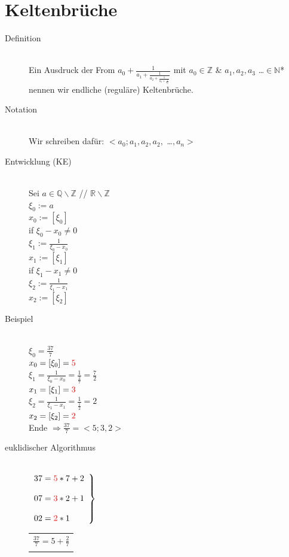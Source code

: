 \documentclass[10pt]{article}
\newcommand{\RN}{\mathbb{R}} %
\newcommand{\NN}{\mathbb{N}} %
\newcommand{\QN}{\mathbb{Q}} %
\newcommand{\ZN}{\mathbb{Z}} %
\newcommand{\Brackar}[2]{\left.\begin{array}{#1} #2 \end{array}\right\rbrace} %
\begin{document}
\section{Keltenbrüche}
\begin{description}
	\item[Definition] \hfill \\
		Ein Ausdruck der From $a_0 + \frac{1}{a_1+\frac{1}{a_2+ \frac{1}{a_3+\frac{1}{a_n}}}}$ mit $a_0 \in \ZN$ \& $a_1,a_2,a_3$ \dots $\in \NN$* nennen wir endliche (reguläre) Keltenbrüche.
	\item[Notation] \hfill \\
		Wir schreiben dafür: $<a_0;a_1,a_2,a_2,$ \dots $,a_n>$
	\item[Entwicklung (KE)] \hfill \\
		Sei $a \in \QN \backslash \ZN$ // $\RN \backslash \ZN$ \\
		$\xi_0:=a$ \\
		$x_0:=[\xi_0]$ \\
		{\color{red}if} $\xi_0-x_0 \neq 0$ \\
		$\xi_1:=\frac{1}{\xi_0-x_0}$ \\
		$x_1:=[\xi_1]$ \\
		{\color{red}if} $\xi_1-x_1 \neq 0$ \\
		$\xi_2:=\frac{1}{\xi_1-x_1}$ \\
		$x_2:=[\xi_2]$
	\item[Beispiel] \hfill \\
		$\xi_0=\frac{37}{7}$ \\
		$x_0=[\xi_0]={\color{red}5}$ \\
		$\xi_1=\frac{1}{\xi_0-x_0}=\frac{1}{\frac{2}{7}}=\frac{7}{2}$ \\
		$x_1=[\xi_1]={\color{red}3}$ \\
		$\xi_2=\frac{1}{\xi_1-x_1}=\frac{1}{\frac{1}{2}}=2$ \\
		$x_2=[\xi_2]={\color{red}2}$ \\
		{\color{red} Ende} $\Rightarrow \frac{37}{7}=<5;3,2>$ \\
	\item[euklidischer Algorithmus] \hfill \\
		$\Brackar{l}{37={\color{red}5}*7+2 \\\\ 07={\color{red}3}*2+1 \\\\ 02={\color{red}2}*1}$
		\begin{tabular}{l}
			$\frac{37}{7}=5+\frac{2}{7}$ \\\\

\end{tabular}
\end{description}
\end{document}
